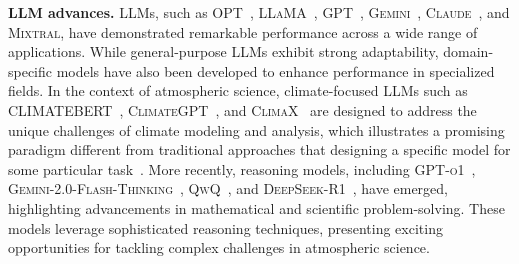 \textbf{LLM advances.}
LLMs, such as \textsc{OPT}~\cite{zhang2022opt}, \textsc{LLaMA}~\cite{touvron2023llama}, \textsc{GPT}~\cite{gpt4o}, \textsc{Gemini}~\cite{reid2024gemini}, \textsc{Claude}~\cite{claude3}, and \textsc{Mixtral}\cite{jiang2024mixtral}, have demonstrated remarkable performance across a wide range of applications. While general-purpose LLMs exhibit strong adaptability, domain-specific models have also been developed to enhance performance in specialized fields.
In the context of atmospheric science, climate-focused LLMs such as \textsc{CLIMATEBERT}~\cite{webersinke2021climatebert}, \textsc{ClimateGPT}~\cite{thulke2024climategpt}, and \textsc{ClimaX~\cite{nguyen2023climax}} are designed to address the unique challenges of climate modeling and analysis, which illustrates a promising paradigm different from traditional approaches that designing a specific model for some particular task~\cite{lam2022graphcast, pathak2022fourcastnet, bi2022pangu, chen2023fengwu, chen2023fuxi}.
More recently, reasoning models, including \textsc{GPT-o1}~\cite{openai_learning_to_reason_with_llms}, \textsc{Gemini-2.0-Flash-Thinking}~\cite{deepmind_gemini_flash_thinking}, \textsc{QwQ}~\cite{qwq-32b-preview}, and \textsc{DeepSeek-R1}~\cite{deepseekai2025deepseekr1incentivizingreasoningcapability}, have emerged, highlighting advancements in mathematical and scientific problem-solving. These models leverage sophisticated reasoning techniques, presenting exciting opportunities for tackling complex challenges in atmospheric science. %




